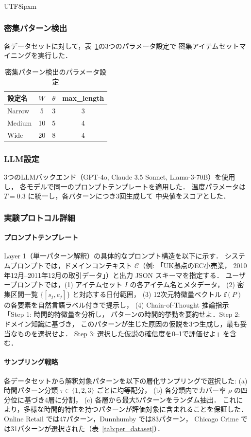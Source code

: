 \documentclass[conference]{IEEEtran}
\begin{document}
\begin{CJK}{UTF8}{ipxm}
\subsubsection{密集パターン検出}
各データセットに対して，表~\ref{tab:configs}の3つのパラメータ設定で
密集アイテムセットマイニングを実行した．

\begin{table}[t]
\centering
\caption{密集パターン検出のパラメータ設定}
\label{tab:configs}
\begin{tabular}{lccc}
\toprule
設定名 & $W$ & $\theta$ & max\_length \\
\midrule
Narrow  & 5  & 3 & 3 \\
Medium  & 10 & 5 & 4 \\
Wide    & 20 & 8 & 4 \\
\bottomrule
\end{tabular}
\end{table}

\subsubsection{LLM設定}
3つのLLMバックエンド（GPT-4o, Claude 3.5 Sonnet, Llama-3-70B）を使用し，
各モデルで同一のプロンプトテンプレートを適用した．
温度パラメータは $T=0.3$ に統一し，各パターンにつき3回生成して
中央値をスコアとした．

\subsubsection{実験プロトコル詳細}

\paragraph{プロンプトテンプレート}
Layer 1（単一パターン解釈）の具体的なプロンプト構造を以下に示す．
システムプロンプトでは，ドメインコンテキスト $\mathcal{C}$（例: 「UK拠点のEC小売業，
2010年12月--2011年12月の取引データ」）と出力 JSON スキーマを指定する．
ユーザープロンプトでは，(1) アイテムセット $I$ の各アイテム名とメタデータ，
(2) 密集区間一覧 $\{[s_j, e_j]\}$ と対応する日付範囲，
(3) 12次元特徴量ベクトル $\mathbf{f}(P)$ の各要素を自然言語ラベル付きで提示し，
(4) Chain-of-Thought 推論指示「Step 1: 時間的特徴量を分析し，
パターンの時間的挙動を要約せよ．Step 2: ドメイン知識に基づき，
このパターンが生じた原因の仮説を3つ生成し，最も妥当なものを選択せよ．
Step 3: 選択した仮説の確信度を0--1で評価せよ」を含む．

\paragraph{サンプリング戦略}
各データセットから解釈対象パターンを以下の層化サンプリングで選択した:
(a) 時間パターン分類 $\tau \in \{1, 2, 3\}$ ごとに均等配分，
(b) 各分類内でカバー率 $\rho$ の四分位に基づき4層に分割，
(c) 各層から最大5パターンをランダム抽出．
これにより，多様な時間的特性を持つパターンが評価対象に含まれることを保証した．
Online Retail では47パターン，Dunnhumby では83パターン，
Chicago Crime では31パターンが選択された（表~\ref{tab:per_dataset}）．


\end{CJK}
\end{document}
